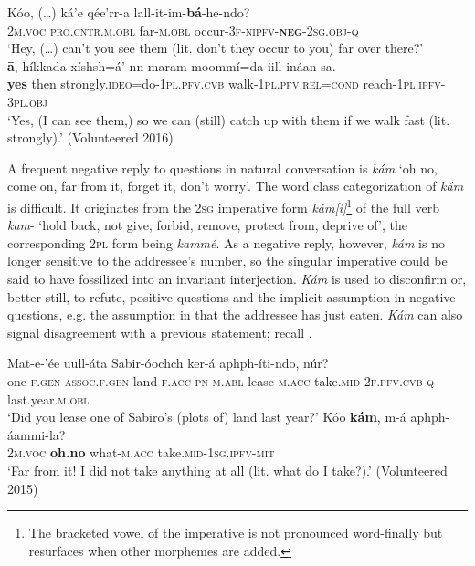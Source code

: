 \documentclass[output=paper,colorlinks,citecolor=brown,draftmode
]{langscibook}
\begin{document}
\ea\label{ex:treis:34}
    \begin{xlist}[B: ]
        \gll Kóo, (…)	ká’e					qée’rr-a		lall-it-im-\textbf{bá}-he-ndo? \\ 
        \textsc{2m.voc}	{} \textsc{pro.cntr.m.obl}	far-\textsc{m.obl}	occur-\textsc{3f-nipfv-\textbf{neg}-2sg.obj-q}\\
        \glt ‘Hey, (…) can’t you see them (lit. don’t they occur to you) far over there?’ \\
        \gll  \textbf{{\Abf}ā},	híkkada	xíshsh=á’-nn					maram-moommí=da 	iill-ináan-sa.\\
        \textbf{yes}	then strongly.\textsc{ideo}=do-\textsc{1pl.pfv.cvb}	walk-\textsc{1pl.pfv.rel=cond} reach-\textsc{1pl.ipfv-3pl.obj}\\
        \glt ‘Yes, (I can see them,) so we can (still) catch up with them if we walk fast (lit. strongly).’ (Volunteered 2016)\\
    \end{xlist}
\z 
A frequent negative reply to questions in natural conversation is \textit{kám} ‘oh no, come on, far from it, forget it, don’t worry’. The word class categorization of \textit{kám} is difficult. It originates from the \textsc{2sg} imperative form \textit{kám[i]}\footnote{The bracketed vowel of the imperative is not pronounced word-finally but resurfaces when other morphemes are added.} of the full verb \textit{kam}- ‘hold back, not give, forbid, remove, protect from, deprive of’, the corresponding \textsc{2pl} form being \textit{kammé}. As a negative reply, however, \textit{kám} is no longer sensitive to the addressee’s number, so the singular imperative could be said to have fossilized into an invariant interjection. \textit{Kám} is used to disconfirm or, better still, to refute, positive questions  and the implicit assumption in negative questions, e.g. the assumption in  that the addressee has just eaten. \textit{Kám} can also signal disagreement with a previous statement; recall .

\ea\label{ex:treis:35}
    \begin{xlist}[B: ]
        \gll Mat-e-’ée					uull-áta		Sabir-óochch	ker-á	aphph-íti-ndo,			núr?\\
        one-\textsc{f.gen}-\textsc{assoc.f.gen}	land-\textsc{f.acc}	\textsc{pn-m.abl}		lease-\textsc{m.acc} take.\textsc{mid-2f.pfv.cvb-q}	last.year.\textsc{m.obl} \\
        \glt ‘Did you lease one of Sabiro’s (plots of) land last year?’
        \gll Kóo	\textbf{kám},		m-á				aphph-áammi-la? \\
        \textsc{2m.voc}	\textbf{oh.no}	what-\textsc{m.acc}	take.\textsc{mid-1sg.ipfv-mit}\\
        \glt ‘Far from it! I did not take anything at all (lit. what do I take?).’ (Volunteered 2015)
    \end{xlist}
\z 
\end{document}
